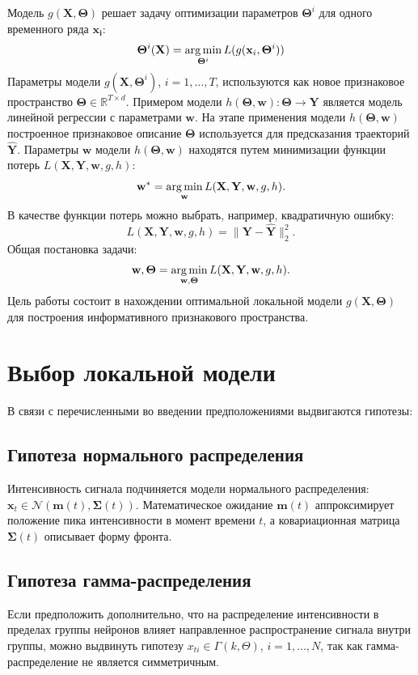 \documentclass[12pt,twoside]{article}
\begin{document}
Модель $g(\mathbf{X}, \mathbf{\Theta})$ решает задачу оптимизации параметров $\mathbf{\Theta}^{i}$ для одного временного ряда $\mathbf{x_{i}}$:
\begin{equation}
\mathbf{\Theta}^i(\mathbf{X}) = \argmin_{\mathbf{\Theta}^i} L(g(\mathbf{x}_i, \mathbf{\Theta}^i))
\end{equation}
Параметры модели $g(\mathbf{X}, \mathbf{\Theta}^i)$, $i = 1,\dots,T$, используются как новое признаковое пространство $\mathbf{\Theta}\in\mathbb{R}^{T\times d}$.
Примером модели $h(\mathbf{\Theta}, \mathbf{w}): \mathbf{\Theta}\to\mathbf{Y}$ является модель линейной регрессии с параметрами $\mathbf{w}$. На этапе применения модели $h(\mathbf{\Theta}, \mathbf{w})$ построенное признаковое описание $\mathbf{\Theta}$ используется для предсказания траекторий $\mathbf{\hat{Y}}$.
Параметры $\mathbf{w}$ модели $h(\mathbf{\Theta}, \mathbf{w})$ находятся путем минимизации функции потерь $L(\mathbf{X}, \mathbf{Y}, \mathbf{w}, g, h)$:
\begin{equation}
\mathbf{w^*} = \argmin_{\mathbf{w}} L(\mathbf{X}, \mathbf{Y}, \mathbf{w}, g, h).
\end{equation}
В качестве функции потерь можно выбрать, например, квадратичную ошибку:
\begin{equation}
L(\mathbf{X}, \mathbf{Y}, \mathbf{w}, g, h) = \|\mathbf{Y}-\mathbf{\hat{Y}}\|^2_2.
\end{equation}
Общая постановка задачи:
\begin{equation}
\mathbf{w}, \mathbf{\Theta} = \argmin_{\mathbf{w}, \mathbf{\Theta}} L(\mathbf{X}, \mathbf{Y}, \mathbf{w}, g, h).
\end{equation}
Цель работы состоит в нахождении оптимальной локальной модели $g(\mathbf{X}, \mathbf{\Theta})$ для построения информативного признакового пространства.

\section{Выбор локальной модели}
В связи с перечисленными во введении предположениями выдвигаются гипотезы: 

\subsection{Гипотеза нормального распределения}
Интенсивность сигнала подчиняется модели нормального распределения: $\mathbf{x}_t \in \mathcal{N}(\mathbf{m}(t),\mathbf{\Sigma}(t))$. Математическое ожидание $\mathbf{m}(t)$ аппроксимирует положение пика интенсивности в момент времени $t$, а ковариационная матрица $\mathbf{\Sigma}(t)$ описывает форму фронта. 

\subsection{Гипотеза гамма-распределения}
Если предположить дополнительно, что на распределение интенсивности в пределах группы нейронов влияет направленное распространение сигнала внутри группы, можно выдвинуть гипотезу $x_{ti}
\in \Gamma(k, \Theta)$, $i=1,\dots,N$, так как гамма-распределение не является симметричным.


\end{document}
